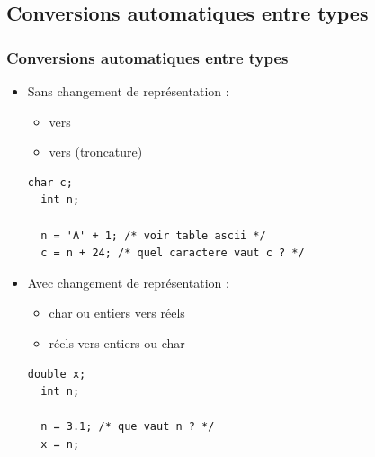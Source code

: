 \documentclass[xcolor=pdftex,svgnames,table]{beamer}
\begin{document}
\subsection[Conversions automatiques]{Conversions automatiques entre types}
\begin{frame}[fragile]
  \frametitle{Conversions  automatiques entre types}

  \begin{itemize}
  \item Sans changement de représentation :
  \begin{itemize}
  \item {} vers 
  \item {} vers  (troncature)
  \end{itemize}\pause
  \begin{lstlisting}[basicstyle=\ttfamily\small]
  char c;
  int n;

  n = 'A' + 1; /* voir table ascii */
  c = n + 24; /* quel caractere vaut c ? */
\end{lstlisting}
 \item Avec changement de représentation :
    \begin{itemize}
    \item char ou entiers vers réels
    \item réels vers entiers ou char
    \end{itemize}
  \begin{lstlisting}[basicstyle=\ttfamily\small]
  double x;
  int n;

  n = 3.1; /* que vaut n ? */
  x = n;
   \end{lstlisting}
  \end{itemize}
\end{frame}
\end{document}
